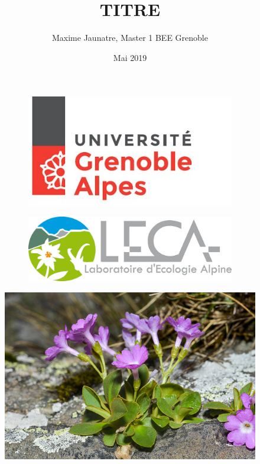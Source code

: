 \documentclass[12pt,a4paper,notitlepage]{article}
\title{TITRE}
\author{Maxime Jaunatre, Master 1 BEE Grenoble}
\date{Mai 2019}
\begin{document}
\begin{titlepage} %
\begin{figure}
\centering
\begin{subfigure}{.5\textwidth}
  \centering
  \includegraphics[width=.8\linewidth]{fig/UGA.jpg}
\end{subfigure}%
\begin{subfigure}{.5\textwidth}
  \centering
  \includegraphics[width=.8\linewidth]{fig/leca.jpg}
\end{subfigure}
\label{fig:test}
\end{figure}
\maketitle
\begin{figure}[h]
\begin{center}
\includegraphics[scale=3]{fig/primulapedemontana_7.jpg}
\end{center}
\end{figure}

\newpage
\begin{abstract} %
\begin{center}

\lipsum[1]

\end{center}
\end{abstract}

\end{titlepage}
\end{document}
